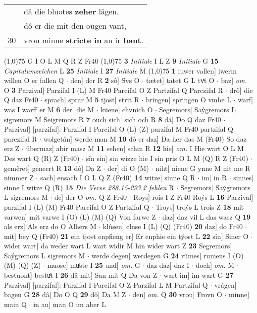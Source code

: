 \documentclass[8pt,a4paper,notitlepage]{article}
\begin{document}
\begin{table}[ht]
\begin{minipage}[t]{0.5\linewidth}
\begin{tabular}{rl}
 & dâ die bluotes \textbf{zeher} lâgen.\\ 
 & dô er die mit den ougen vant,\\ 
30 & vrou minne \textbf{stricte in} an ir \textbf{bant}.\\ 
\end{tabular}
\scriptsize
\line(1,0){75} \newline
G I O L M Q R Z Fr40 \newline
\line(1,0){75} \newline
\textbf{3} \textit{Initiale} I L Z  \textbf{9} \textit{Initiale} G  \textbf{15} \textit{Capitulumzeichen} L  \textbf{25} \textit{Initiale} I  \textbf{27} \textit{Initiale} M  \newline
\line(1,0){75} \newline
\textbf{1} iuwer vallen] iwerm willen O er fallen Q  $\cdot$ den] der R \textbf{2} sô] Svs O  $\cdot$ tætet] tatet G L tvͦt O  $\cdot$ baz] \textit{om.} O \textbf{3} Parzival] Parzifal I (L) M Fr40 Parcifal O Z Partzifal Q Parczifal R  $\cdot$ drô] die Q daz Fr40  $\cdot$ sprach] sprar M \textbf{5} tjost] strit R  $\cdot$ bringen] springen O vmbe L  $\cdot$ warf] was I warff er M \textbf{6} der] die M  $\cdot$ küene] chvnich O  $\cdot$ Segremors] Saýgremors L sigremors M Seigremors R \textbf{7} ouch sich] sich och R \textbf{8} dâ] Do Q daz Fr40  $\cdot$ Parzival] [parzifal]: Parzifal I Parcifal O (L) (Z) parzifal M Fr40 partzifal Q parczifal R  $\cdot$ wolgetân] werde man M \textbf{10} dô er daz] Da her das M (Fr40) So daz erz Z  $\cdot$ übermaz] abir masz M \textbf{11} sehen] schin R \textbf{12} hie] \textit{om.} I Hie wart O L M Des wart Q (R) Z (Fr40)  $\cdot$ sîn sin] sin wizze hie I sin pris O L M (Q) R Z (Fr40)  $\cdot$ gemêret] geneert R \textbf{13} dô] Da Z  $\cdot$ der] di O (M)  $\cdot$ niht] niene G ynne M nit me R nimmer Z  $\cdot$ sach] ensach I O L Q Z (Fr40) \textbf{14} witze] sinne Q R  $\cdot$ im] in R  $\cdot$ sinnes] sinne I witze Q (R) \textbf{15} \textit{Die Verse 288.15-293.2 fehlen} R   $\cdot$ Segremors] Saýgremors L sigremors M  $\cdot$ de] der O \textit{om.} Q Z Fr40  $\cdot$ Roys] rois I Z Fr40 Roýs L \textbf{16} Parzival] parzifal I (L) (M) Fr40 Parcifal O Z Partzifal Q  $\cdot$ Troys] troýs L trois Z \textbf{18} mit varwen] mit varwe I (O) (L) (M) (Q) Von farwe Z  $\cdot$ daz] daz vil L das wasz Q \textbf{19} als erz] Als erz do O Alhers M  $\cdot$ klûsen] cluse I (L) (Q) (Fr40) \textbf{20} daz] do Fr40  $\cdot$ mit] bey Q (Fr40) \textbf{21} ein tjost enpfieng er] Er enphie ein týost L \textbf{22} sîn] Siner O  $\cdot$ wider wart] da weder wart L wart widir M hin wider wart Z \textbf{23} Segremors] Saýgremors L sigremors M  $\cdot$ werde degen] werdegen G \textbf{24} rûmes] rumens I (O) (M) (Q) (Z)  $\cdot$ muose] muͤste I \textbf{25} und] \textit{om.} G  $\cdot$ daz daz] daz I  $\cdot$ doch] \textit{om.} M  $\cdot$ bestuont] bestuͤt I \textbf{26} dâ mit] San mit Q Da von Z  $\cdot$ wart im] im wart G \textbf{27} Parzival] [parzifal]: Parzifal I Parcifal O Z Parzifal L M Partzifal Q  $\cdot$ vrâgen] bagen G \textbf{28} dâ] Do O Q \textbf{29} dô] Da M Z  $\cdot$ den] \textit{om.} Q \textbf{30} vrou] Frovn O  $\cdot$ minne] main Q  $\cdot$ in an] man O im aber L \newline

\end{minipage}
\end{table}
\end{document}
